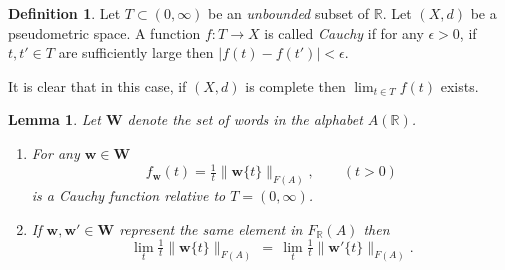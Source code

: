 \documentclass[12pt]{amsart}
\newtheorem{lemma}[prop]{Lemma}
\theoremstyle{definition}
\newtheorem{defn}[prop]{Definition}
\def\RR{\ensuremath{\mathbb{R}}}
\newcommand{\B}[1]{\mathbf{#1}}
\newcommand{\trc}[1]{\{ #1 \}}   %
\def\Free{F}
\begin{document}
\begin{defn}\label{D:Cauchy function}
Let $T \subset (0,\infty)$ be an {\em unbounded} subset of $\RR$.
Let $(X,d)$ be a pseudometric space.
A function $f \colon T \to X$ is called {\em Cauchy} if for any $\epsilon>0$, if $t,t' \in T$ are sufficiently large then $|f(t)-f(t')|<\epsilon$.
\end{defn}


It is clear that in this case, if $(X,d)$ is complete then $\lim_{t \in T} f(t)$ exists.



\begin{lemma}\label{L:w[t]/t properties}%
Let $\B W$ denote the set of words in the alphabet $A(\RR)$.
\begin{enumerate}[label=(\alph*)]
\item
\label{L:w[t]/t properties:a}
For any $\B w \in \B W$ 
\[
f_{\B w}(t) = \tfrac{1}{t} \| \B w\trc{t} \|_{\Free(A)}, \qquad (t>0)
\]
is a Cauchy function relative to $T=(0,\infty)$.

\item
\label{L:w[t]/t properties:b}
If $\B w, \B w' \in \B W$ represent the same element in $F_\RR(A)$ then 
\[
\lim_t \tfrac{1}{t} \| \B w\trc{t} \|_{\Free(A)} \, = \, \lim_t \tfrac{1}{t} \| \B w'\trc{t} \|_{\Free(A)}.
\]
\end{enumerate}
\end{lemma}
\end{document}
